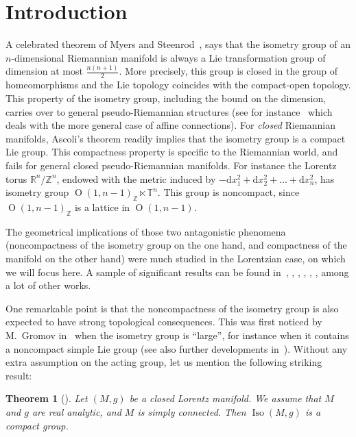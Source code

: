 \documentclass[11pt]{article}
\newtheorem{theo}{Theorem}[section]
\theoremstyle{definition}
\numberwithin{equation}{section}
\numberwithin{figure}{section}
\numberwithin{table}{section}
\DeclareMathOperator{\Iso}{Iso}
\DeclareMathOperator{\Omp}{O}%
\newcommand*\TT{\mathbb{T}}
\newcommand*\RR{\mathbb{R}}
\newcommand*\ZZ{\mathbb{Z}}
\newcommand*{\dd}{\mathrm{d}}
\newcommand*{\dx}{\dd x}
\begin{document}
\section{Introduction} 
A celebrated theorem of Myers and Steenrod~\cite{myers-steenrod}, says that the isometry group of an $n$-dimensional Riemannian manifold is always a Lie transformation group of dimension at most $\frac{n(n+1)}{2}$. More precisely, this group is closed in the group of homeomorphisms and the Lie topology coincides with the compact-open topology. This property of the isometry group, including the bound on the dimension, carries over to general pseudo-Riemannian structures (see for instance~\cite{nomizu2} which deals with the more general case of affine connections). For \emph{closed} Riemannian manifolds, Ascoli's theorem readily implies that the isometry group is a compact Lie group. This compactness property is specific to the Riemannian world, and fails for general closed pseudo-Riemannian manifolds. For instance the Lorentz torus $ \RR^n /\ZZ^n$, endowed with the metric induced by $-\dx_1^2+\dx_2^2+\ldots+\dx_n^2$, has isometry group $\Omp(1,n-1)_{\ZZ}\ltimes\TT^n$. This group is noncompact, since $\Omp(1,n-1)_{\ZZ}$ is a lattice in $\Omp(1,n-1)$.

The geometrical implications of those two antagonistic phenomena (noncompact\-ness of the isometry group on the one hand, and compactness of the manifold on the other hand) were much studied in the Lorentzian case, on which we will focus here. A sample of significant results can be found in~\cite{adams.stuck}, \cite{gromov}, \cite{zeghib.isom}, \cite{zeghibisom1}, \cite{zeghibisom2}, \cite{zimmer.iso}, among a lot of other works.

One remarkable point is that the noncompactness of the isometry group is also expected to have strong topological consequences. This was first noticed by M.~Gromov in~\cite{gromov} when the isometry group is ``large'', for instance when it contains a noncompact simple Lie group (see also further developments in~\cite{fisher.zimmer}). Without any extra assumption on the acting group, let us mention the following striking result:



\begin{theo}[\cite{dambra}]\label{thm.dambra}
Let $(M,g)$ be a closed Lorentz manifold. We assume that $M$ and $g$ are real analytic, and $M$ is simply connected. Then $\Iso(M,g)$ is a compact group.
\end{theo}
\end{document}
